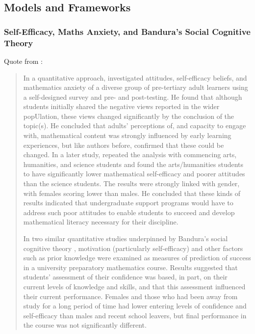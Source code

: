 \documentclass[twoside,12pt,a4paper]{report}
\begin{document}
\subsection{Models and Frameworks}

\subsubsection{Self-Efficacy, Maths Anxiety, and Bandura's Social Cognitive Theory}



Quote from \cite{Galligan2008}:
\begin{quote}
In a quantitative approach,  investigated attitudes, self-efficacy
beliefs, and mathematics anxiety of a diverse group of pre-tertiary adult learners
using a self-designed survey and pre- and post-testing. He found that although
students initially shared the negative views reported in the wider popUlation, these
views changed significantly by the conclusion of the topic(s). He concluded that
adults' perceptions of, and capacity to engage with, mathematical content was
strongly influenced by early learning experiences, but like authors before,
confirmed that these could be changed. In a later study,  repeated
the analysis with commencing arts, humanities, and science students and found the
arts/humanities students to have significantly lower mathematical self-efficacy and
poorer attitudes than the science students. The results were strongly linked with
gender, with females scoring lower than males. He concluded that these kinds of
results indicated that undergraduate support programs would have to address such
poor attitudes to enable students to succeed and develop mathematical literacy
necessary for their discipline.

In two similar quantitative studies underpinned by Bandura's social cognitive
theory \cite{Carmichael2006, Carmichael2005},
motivation (particularly self-efficacy) and other factors such as prior knowledge
were examined as measures of prediction of success in a university preparatory
mathematics course. Results suggested that students' assessment of their
confidence was based, in part, on their current levels of knowledge and skills, and
that this assessment influenced their current performance. Females and those who
had been away from study for a long period of time had lower entering levels of
confidence and self-efficacy than males and recent school leavers, but final
performance in the course was not significantly different.


\end{quote}
\end{document}
